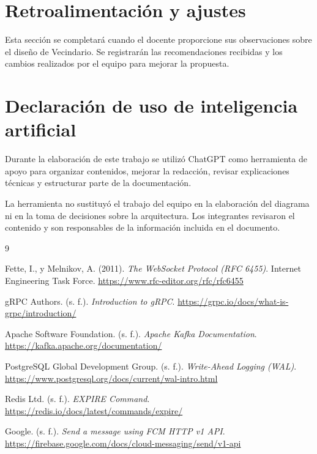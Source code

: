 \documentclass[12pt,a4paper]{article}
\begin{document}
\section{Retroalimentación y ajustes}

Esta sección se completará cuando el docente proporcione
sus observaciones sobre el diseño de Vecindario. Se
registrarán las recomendaciones recibidas y los cambios
realizados por el equipo para mejorar la propuesta.


\section{Declaración de uso de inteligencia artificial}

Durante la elaboración de este trabajo se utilizó
ChatGPT como herramienta de apoyo para organizar
contenidos, mejorar la redacción, revisar explicaciones
técnicas y estructurar parte de la documentación.

La herramienta no sustituyó el trabajo del equipo en
la elaboración del diagrama ni en la toma de decisiones
sobre la arquitectura. Los integrantes revisaron el
contenido y son responsables de la información incluida
en el documento.



\begin{thebibliography}{9}

Fette, I., y Melnikov, A. (2011).
\textit{The WebSocket Protocol (RFC 6455)}.
Internet Engineering Task Force.
\url{https://www.rfc-editor.org/rfc/rfc6455}

gRPC Authors. (s. f.).
\textit{Introduction to gRPC}.
\url{https://grpc.io/docs/what-is-grpc/introduction/}

Apache Software Foundation. (s. f.).
\textit{Apache Kafka Documentation}.
\url{https://kafka.apache.org/documentation/}

PostgreSQL Global Development Group. (s. f.).
\textit{Write-Ahead Logging (WAL)}.
\url{https://www.postgresql.org/docs/current/wal-intro.html}

Redis Ltd. (s. f.).
\textit{EXPIRE Command}.
\url{https://redis.io/docs/latest/commands/expire/}

Google. (s. f.).
\textit{Send a message using FCM HTTP v1 API}.
\url{https://firebase.google.com/docs/cloud-messaging/send/v1-api}

\end{thebibliography}
\end{document}
